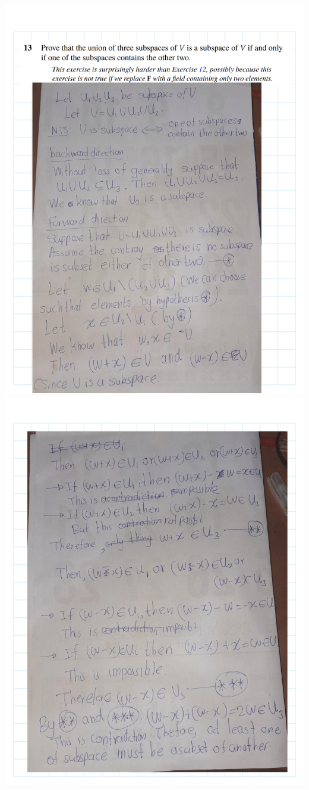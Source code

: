 \documentclass[
]{book}
\theoremstyle{definition}
\theoremstyle{definition}
\theoremstyle{definition}
\theoremstyle{definition}
\theoremstyle{remark}
\begin{document}
\begin{enumerate}
  \includegraphics{fig/Ex1C/Ex/Ex-14.png}
  \includegraphics{fig/Ex1C/Ex/Ex-15.png}

\end{enumerate}
\end{document}
